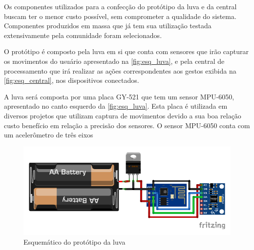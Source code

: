 Os componentes utilizados para a confecção do protótipo da luva e da central buscam ter o menor custo possível, sem comprometer a qualidade do sistema. Componentes produzidos em massa que já tem sua utilização testada extensivamente pela comunidade foram selecionados. 

O protótipo é composto pela luva em si que conta com sensores que irão capturar os movimentos do usuário apresentado na \autoref{fig:esq_luva}, e pela central de processamento que irá realizar as ações correspondentes aos gestos exibida na \autoref{fig:esq_central}, nos dispositivos conectados.

A luva será composta por uma placa GY-521 que tem um sensor MPU-6050, apresentado no canto esquerdo da \autoref{fig:esq_luva}. Esta placa é utilizada em diversos projetos que utilizam captura de movimentos devido a sua boa relação custo benefício em relação a precisão dos sensores. O sensor MPU-6050 conta com um acelerômetro de três eixos 



\begin{figure}[ht]
    \centering
    \includegraphics{resources/esquematico_tcc_bb.pdf}
    \caption{Esquemático do protótipo da luva}
    \label{fig:esq_luva}
\end{figure}

